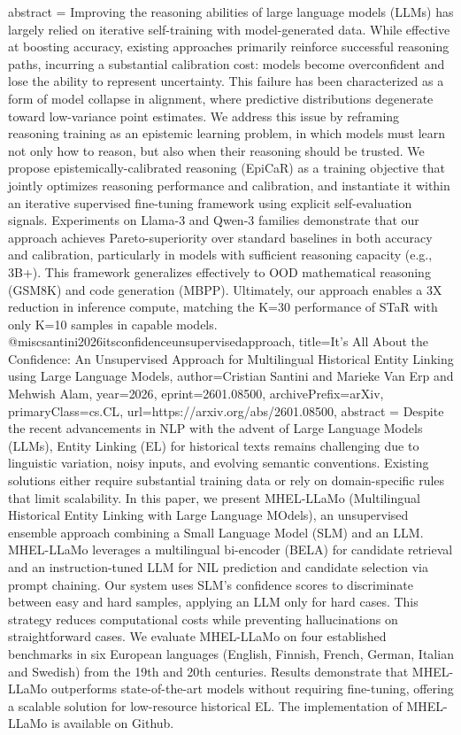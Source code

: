 {      abstract = {Improving the reasoning abilities of large language models (LLMs) has largely relied on iterative self-training with model-generated data. While effective at boosting accuracy, existing approaches primarily reinforce successful reasoning paths, incurring a substantial calibration cost: models become overconfident and lose the ability to represent uncertainty. This failure has been characterized as a form of model collapse in alignment, where predictive distributions degenerate toward low-variance point estimates. We address this issue by reframing reasoning training as an epistemic learning problem, in which models must learn not only how to reason, but also when their reasoning should be trusted. We propose epistemically-calibrated reasoning (EpiCaR) as a training objective that jointly optimizes reasoning performance and calibration, and instantiate it within an iterative supervised fine-tuning framework using explicit self-evaluation signals. Experiments on Llama-3 and Qwen-3 families demonstrate that our approach achieves Pareto-superiority over standard baselines in both accuracy and calibration, particularly in models with sufficient reasoning capacity (e.g., 3B+). This framework generalizes effectively to OOD mathematical reasoning (GSM8K) and code generation (MBPP). Ultimately, our approach enables a 3X reduction in inference compute, matching the K=30 performance of STaR with only K=10 samples in capable models.}
}@misc{santini2026itsconfidenceunsupervisedapproach,
      title={It's All About the Confidence: An Unsupervised Approach for Multilingual Historical Entity Linking using Large Language Models}, 
      author={Cristian Santini and Marieke Van Erp and Mehwish Alam},
      year={2026},
      eprint={2601.08500},
      archivePrefix={arXiv},
      primaryClass={cs.CL},
      url={https://arxiv.org/abs/2601.08500},
      abstract = {Despite the recent advancements in NLP with the advent of Large Language Models (LLMs), Entity Linking (EL) for historical texts remains challenging due to linguistic variation, noisy inputs, and evolving semantic conventions. Existing solutions either require substantial training data or rely on domain-specific rules that limit scalability. In this paper, we present MHEL-LLaMo (Multilingual Historical Entity Linking with Large Language MOdels), an unsupervised ensemble approach combining a Small Language Model (SLM) and an LLM. MHEL-LLaMo leverages a multilingual bi-encoder (BELA) for candidate retrieval and an instruction-tuned LLM for NIL prediction and candidate selection via prompt chaining. Our system uses SLM's confidence scores to discriminate between easy and hard samples, applying an LLM only for hard cases. This strategy reduces computational costs while preventing hallucinations on straightforward cases. We evaluate MHEL-LLaMo on four established benchmarks in six European languages (English, Finnish, French, German, Italian and Swedish) from the 19th and 20th centuries. Results demonstrate that MHEL-LLaMo outperforms state-of-the-art models without requiring fine-tuning, offering a scalable solution for low-resource historical EL. The implementation of MHEL-LLaMo is available on Github.}
}
